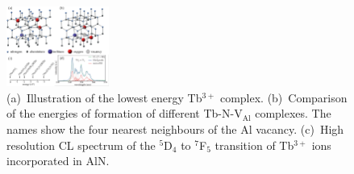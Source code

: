 \documentclass[%
aip,
rsi,%
 amsmath,amssymb,%
 reprint,%
]{revtex4-1}
\begin{document}
\begin{figure}%
	\includegraphics[width=0.3\textwidth]{model}
    \caption{(a)~Illustration of the lowest energy Tb$^{3+}$ complex. (b)~Comparison of the energies of formation of different Tb-N-V$_\text{Al}$ complexes. The names show the four nearest neighbours of the Al vacancy. (c)~High resolution CL spectrum of the $^5$D$_4$ to $^7$F$_5$ transition of Tb$^{3+}$ ions incorporated in AlN.}
    \label{fig:felix_model}
\end{figure}
\end{document}
